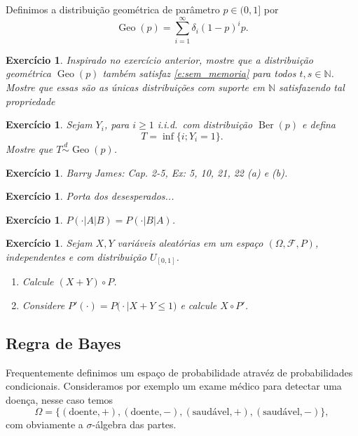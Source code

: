 \documentclass[reqno, draft]{book}
\newcommand*\1{\mathds{1}}
\newtheorem{exercise}[example]{Exercício}
\DeclareMathOperator{\Ber}{Ber}
\DeclareMathOperator{\Geo}{Geo}
\def \iid{i.i.d.~}
\begin{document}
Definimos a distribuição geométrica  de parâmetro $p \in (0,1]$ por
\begin{equation}
  \Geo(p) = \sum_{i = 1}^\infty \delta_i (1-p)^i p.
\end{equation}

\begin{exercise}
  Inspirado no exercício anterior, mostre que a distribuição geométrica $\Geo(p)$ também satisfaz \eqref{e:sem_memoria} para todos $t, s \in \mathbb{N}$.
  Mostre que essas são as únicas distribuições com suporte em $\mathbb{N}$ satisfazendo tal propriedade
\end{exercise}

\begin{exercise}
  \label{x:geo_time}
  Sejam $Y_i$, para $i \geq 1$ \iid com distribuição $\Ber(p)$ e defina
  \begin{equation}
    T = \inf\{i; Y_i = 1\}.
  \end{equation}
  Mostre que $T \overset{d}\sim \Geo(p)$.
\end{exercise}

\begin{exercise}
  Barry James: Cap. 2-5, Ex: 5, 10, 21, 22 (a) e (b).
\end{exercise}

\begin{exercise}
  Porta dos desesperados...
\end{exercise}

\begin{exercise}
  $P(\cdot|A|B) = P(\cdot|B|A)$.
\end{exercise}

\begin{exercise}
  Sejam $X, Y$ vari\'aveis aleat\'orias em um espaço $(\Omega, \mathcal{F}, P)$, independentes e com distribuição $U_{[0,1]}$.
  \begin{enumerate}[\quad a)]
  \item Calcule $(X+Y) \circ P$.
  \item Considere $P'(\cdot) = P\big(\cdot | X + Y \leq 1 \big)$ e calcule $X \circ P'$.
  \end{enumerate}
\end{exercise}

\subsection{Regra de Bayes}

Frequentemente definimos um espaço de probabilidade atravéz de probabilidades condicionais.
Consideramos por exemplo um exame médico para detectar uma doença, nesse caso temos
\begin{equation}
  \Omega = \{(\text{doente}, +), (\text{doente}, -), (\text{saudável}, +), (\text{saudável}, -)\},
\end{equation}
com obviamente a $\sigma$-álgebra das partes.
\end{document}
